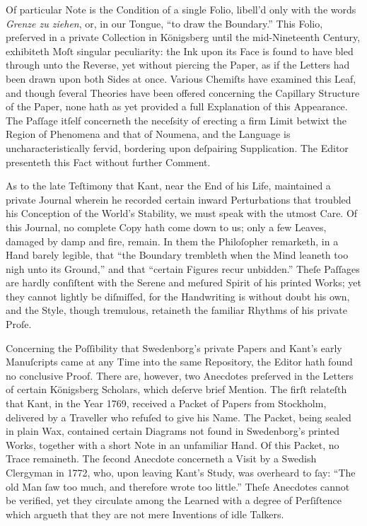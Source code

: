 \documentclass[12pt]{book}
\begin{document}
\noindent
Of particular Note is the Condition of a single Folio, libell’d only with the words \textit{Grenze zu ziehen}, or, in our Tongue, “to draw the Boundary.” This Folio, preſerved in a private Collection in Königsberg until the mid-Nineteenth Century, exhibiteth Moſt singular peculiarity: the Ink upon its Face is found to have bled through unto the Reverse, yet without piercing the Paper, as if the Letters had been drawn upon both Sides at once. Various Chemiſts have examined this Leaf, and though ſeveral Theories have been offered concerning the Capillary Structure of the Paper, none hath as yet provided a full Explanation of this Appearance. The Paſſage itſelf concerneth the neceſsity of erecting a firm Limit betwixt the Region of Phenomena and that of Noumena, and the Language is uncharacteristically fervid, bordering upon deſpairing Supplication. The Editor presenteth this Fact without further Comment.

\vspace{1em}

\noindent
As to the late Teſtimony that Kant, near the End of his Life, maintained a private Journal wherein he recorded certain inward Perturbations that troubled his Conception of the World’s Stability, we must speak with the utmost Care. Of this Journal, no complete Copy hath come down to us; only a few Leaves, damaged by damp and fire, remain. In them the Philoſopher remarketh, in a Hand barely legible, that “the Boundary trembleth when the Mind leaneth too nigh unto its Ground,” and that “certain Figures recur unbidden.” Theſe Paſſages are hardly conſiſtent with the Serene and meſured Spirit of his printed Works; yet they cannot lightly be diſmiſſed, for the Handwriting is without doubt his own, and the Style, though tremulous, retaineth the familiar Rhythms of his private Proſe.

\vspace{1em}

\noindent
Concerning the Poſſibility that Swedenborg’s private Papers and Kant’s early Manuſcripts came at any Time into the same Repository, the Editor hath found no conclusive Proof. There are, however, two Anecdotes preſerved in the Letters of certain Königsberg Scholars, which deſerve brief Mention. The firſt relateſth that Kant, in the Year 1769, received a Packet of Papers from Stockholm, delivered by a Traveller who refuſed to give his Name. The Packet, being sealed in plain Wax, contained certain Diagrams not found in Swedenborg’s printed Works, together with a short Note in an unfamiliar Hand. Of this Packet, no Trace remaineth. The ſecond Anecdote concerneth a Visit by a Swedish Clergyman in 1772, who, upon leaving Kant’s Study, was overheard to ſay: “The old Man ſaw too much, and therefore wrote too little.” Theſe Anecdotes cannot be verified, yet they circulate among the Learned with a degree of Perſiſtence which argueth that they are not mere Inventions of idle Talkers.
\end{document}
